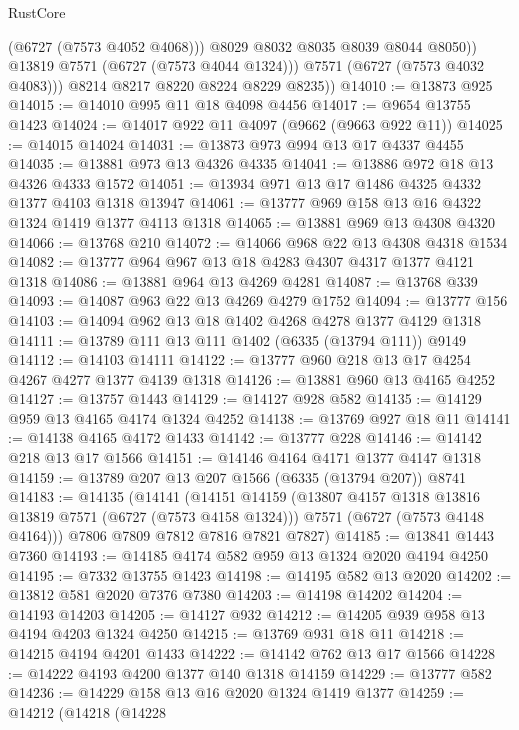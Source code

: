 \begin{lexlean}{RustCore}
\begin{coremodule}
                  (@6727 (@7573 @4052 @4068)))
                @8029
                @8032
                @8035
                @8039
                @8044
                @8050))
            @13819
            @7571
            (@6727 (@7573 @4044 @1324)))
          @7571
          (@6727 (@7573 @4032 @4083)))
        @8214
        @8217
        @8220
        @8224
        @8229
        @8235))
@14010 := @13873 @925
@14015 := @14010 @995 @11 @18 @4098 @4456
@14017 := @9654 @13755 @1423
@14024 := @14017 @922 @11 @4097 (@9662 (@9663 @922 @11))
@14025 := @14015 @14024
@14031 := @13873 @973 @994 @13 @17 @4337 @4455
@14035 := @13881 @973 @13 @4326 @4335
@14041 := @13886 @972 @18 @13 @4326 @4333 @1572
@14051 := @13934 @971 @13 @17 @1486 @4325 @4332 @1377 @4103 @1318 @13947
@14061 := @13777 @969 @158 @13 @16 @4322 @1324 @1419 @1377 @4113 @1318
@14065 := @13881 @969 @13 @4308 @4320
@14066 := @13768 @210
@14072 := @14066 @968 @22 @13 @4308 @4318 @1534
@14082 := @13777 @964 @967 @13 @18 @4283 @4307 @4317 @1377 @4121 @1318
@14086 := @13881 @964 @13 @4269 @4281
@14087 := @13768 @339
@14093 := @14087 @963 @22 @13 @4269 @4279 @1752
@14094 := @13777 @156
@14103 := @14094 @962 @13 @18 @1402 @4268 @4278 @1377 @4129 @1318
@14111 := @13789 @111 @13 @111 @1402 (@6335 (@13794 @111)) @9149
@14112 := @14103 @14111
@14122 := @13777 @960 @218 @13 @17 @4254 @4267 @4277 @1377 @4139 @1318
@14126 := @13881 @960 @13 @4165 @4252
@14127 := @13757 @1443
@14129 := @14127 @928 @582
@14135 := @14129 @959 @13 @4165 @4174 @1324 @4252
@14138 := @13769 @927 @18 @11
@14141 := @14138 @4165 @4172 @1433
@14142 := @13777 @228
@14146 := @14142 @218 @13 @17 @1566
@14151 := @14146 @4164 @4171 @1377 @4147 @1318
@14159 := @13789 @207 @13 @207 @1566 (@6335 (@13794 @207)) @8741
@14183 := @14135
    (@14141
      (@14151
        @14159
        (@13807 @4157 @1318 @13816 @13819 @7571 (@6727 (@7573 @4158 @1324)))
        @7571
        (@6727 (@7573 @4148 @4164)))
      @7806
      @7809
      @7812
      @7816
      @7821
      @7827)
@14185 := @13841 @1443 @7360
@14193 := @14185 @4174 @582 @959 @13 @1324 @2020 @4194 @4250
@14195 := @7332 @13755 @1423
@14198 := @14195 @582 @13 @2020
@14202 := @13812 @581 @2020 @7376 @7380
@14203 := @14198 @14202
@14204 := @14193 @14203
@14205 := @14127 @932
@14212 := @14205 @939 @958 @13 @4194 @4203 @1324 @4250
@14215 := @13769 @931 @18 @11
@14218 := @14215 @4194 @4201 @1433
@14222 := @14142 @762 @13 @17 @1566
@14228 := @14222 @4193 @4200 @1377 @140 @1318 @14159
@14229 := @13777 @582
@14236 := @14229 @158 @13 @16 @2020 @1324 @1419 @1377
@14259 := @14212
    (@14218
      (@14228

\end{coremodule}
\end{lexlean}
